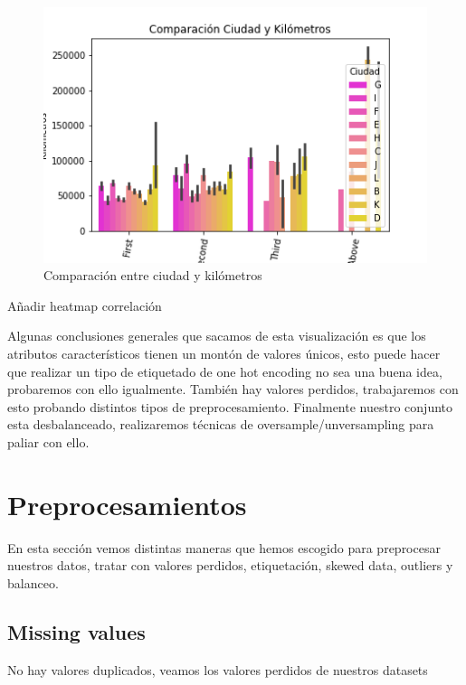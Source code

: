 \documentclass[12pt,twoside]{report}
\begin{document}
\begin{figure}[H]
\includegraphics[width=\textwidth]{../notebooks/figures/ciudad_km.png}
\caption{Comparación entre ciudad y kilómetros}
\label{fig:ciudad_km}
\end{figure} 

Añadir heatmap correlación

Algunas conclusiones generales que sacamos de esta visualización es que los atributos característicos tienen un montón de valores únicos, esto puede hacer que realizar un tipo de etiquetado de one hot encoding no sea una buena idea, probaremos con ello igualmente. También hay valores perdidos, trabajaremos con esto probando distintos tipos de preprocesamiento. Finalmente nuestro conjunto esta desbalanceado, realizaremos técnicas de oversample/unversampling para paliar con ello.

\section*{Preprocesamientos}

En esta sección vemos distintas maneras que hemos escogido para preprocesar nuestros datos, tratar con valores perdidos, etiquetación, skewed data, outliers y balanceo.

\subsection*{Missing values}

No hay valores duplicados, veamos los valores perdidos de nuestros datasets
\end{document}
